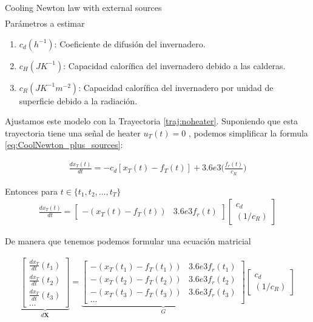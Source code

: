 \begin{model}{Cooling Newton law with external sources}{}
\begin{gather}
        \end{gather}
        Parámetros a estimar 
        \begin{enumerate}
            \item $c_d( h^{-1})$: Coeficiente de difusión del invernadero.
            \item $c_H(JK^{-1})$: Capacidad calorífica del invernadero debido a las calderas.
            \item $c_R(JK^{-1}m^{-2})$: Capacidad calorífica del invernadero por unidad de superficie debido a la radiación.
        \end{enumerate}
    \end{model}
    
    
    
    Ajustamos este modelo con la Trayectoria \ref{traj:noheater}. Suponiendo que esta trayectoria tiene una señal de heater $u_T(t) = 0$ , podemos simplificar la formula \eqref{eq:CoolNewton_plus_sources}:
    
    \begin{gather}
        \frac{dx_{T}(t)}{dt} = -c_d[x_{T}(t) - f_{T}(t)] + 
        3.6e3     \Bigg( \frac{f_{r}(t)}{ c_R } \Bigg)  
    \end{gather}
     
    Entonces para $t \in \{t_1,t_2,\dots,t_T\}$
    \begin{gather}
    \frac{dx_{T}(t)}{dt} = \begin{bmatrix}
        -(x_T(t) - f_T(t)) & 3.6e3 f_r(t) 
    \end{bmatrix} \begin{bmatrix}
        c_d \\ (1/c_R)
    \end{bmatrix}
    \end{gather}
    
    
    De manera que tenemos podemos formular una ecuación matricial
    
    \begin{gather}
        \underbrace{
        \begin{bmatrix}
            \frac{dx_{T}}{dt}(t_1) \\
            \frac{dx_{T}}{dt}(t_2) \\
            \frac{dx_{T}}{dt}(t_3) \\
            \dots
        \end{bmatrix}}_{d\bm{X}} = 
        \underbrace{\begin{bmatrix}
            -(x_T(t_1) - f_T(t_1)) & 3.6e3 f_r(t_1)  \\
            -(x_T(t_2) - f_T(t_2)) & 3.6e3 f_r(t_2)  \\
            -(x_T(t_3) - f_T(t_3)) & 3.6e3 f_r(t_3)  \\
            \dots
        \end{bmatrix}}_{G} \begin{bmatrix}
            c_d \\ (1/c_R)
        \end{bmatrix}
        \end{gather}
    

